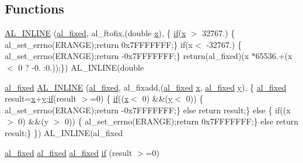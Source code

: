 \subsection*{Functions}
\begin{DoxyCompactItemize}
\item 
\hyperlink{fmaths_8inl_a212fd5cd1111c68a88623f17e1e4d2b9}{A\+L\+\_\+\+I\+N\+L\+I\+NE} (\hyperlink{fixed_8h_acaad2e927f969d9882d1e1e80ac1c5e2}{al\+\_\+fixed}, al\+\_\+ftofix,(double \hyperlink{fmaths_8inl_a7ba8ab2f1e8f362163e17da3f15a5db9}{x}), \{ \hyperlink{fmaths_8inl_a8ad2d7d1a24282db868a211942368bd1}{if}(\hyperlink{fmaths_8inl_a7ba8ab2f1e8f362163e17da3f15a5db9}{x} $>$ 32767.) \{ al\+\_\+set\+\_\+errno(E\+R\+A\+N\+GE);return 0x7\+F\+F\+F\+F\+F\+F\+F;\} if(x$<$ -\/32767.) \{ al\+\_\+set\+\_\+errno(\+E\+R\+A\+N\+G\+E);return -\/0x7\+F\+F\+F\+F\+F\+F\+F;\} return(al\+\_\+fixed)(x $\ast$65536.+(x$<$ 0 ? -\/0. \+:0.));\}) A\+L\+\_\+\+I\+N\+L\+I\+N\+E(double
\item 
\hyperlink{fixed_8h_acaad2e927f969d9882d1e1e80ac1c5e2}{al\+\_\+fixed} \hyperlink{fmaths_8inl_a60f6d5a1431c89de8d088dfb0381426f}{A\+L\+\_\+\+I\+N\+L\+I\+NE} (\hyperlink{fixed_8h_acaad2e927f969d9882d1e1e80ac1c5e2}{al\+\_\+fixed}, al\+\_\+fixadd,(\hyperlink{fixed_8h_acaad2e927f969d9882d1e1e80ac1c5e2}{al\+\_\+fixed} \hyperlink{fmaths_8inl_a7ba8ab2f1e8f362163e17da3f15a5db9}{x}, \hyperlink{fixed_8h_acaad2e927f969d9882d1e1e80ac1c5e2}{al\+\_\+fixed} \hyperlink{fmaths_8inl_ad01ab75ae50a1a624185bfa014c66cfa}{y}), \{ \hyperlink{fixed_8h_acaad2e927f969d9882d1e1e80ac1c5e2}{al\+\_\+fixed} result=\hyperlink{fmaths_8inl_a7ba8ab2f1e8f362163e17da3f15a5db9}{x}+\hyperlink{fmaths_8inl_ad01ab75ae50a1a624185bfa014c66cfa}{y};\hyperlink{fmaths_8inl_a8ad2d7d1a24282db868a211942368bd1}{if}(result $>$=0) \{ \hyperlink{fmaths_8inl_a8ad2d7d1a24282db868a211942368bd1}{if}((\hyperlink{fmaths_8inl_a7ba8ab2f1e8f362163e17da3f15a5db9}{x}$<$ 0) \&\&(\hyperlink{fmaths_8inl_ad01ab75ae50a1a624185bfa014c66cfa}{y}$<$ 0)) \{ al\+\_\+set\+\_\+errno(E\+R\+A\+N\+GE);return -\/0x7\+F\+F\+F\+F\+F\+F\+F;\} else return result;\} else \{ if((x $>$ 0) \&\&(y $>$ 0)) \{ al\+\_\+set\+\_\+errno(\+E\+R\+A\+N\+G\+E);return 0x7\+F\+F\+F\+F\+F\+F\+F;\} else return result;\} \}) A\+L\+\_\+\+I\+N\+L\+I\+N\+E(al\+\_\+fixed
\item 
\hyperlink{fixed_8h_acaad2e927f969d9882d1e1e80ac1c5e2}{al\+\_\+fixed} \hyperlink{fixed_8h_acaad2e927f969d9882d1e1e80ac1c5e2}{al\+\_\+fixed} \hyperlink{fixed_8h_acaad2e927f969d9882d1e1e80ac1c5e2}{al\+\_\+fixed} \hyperlink{fmaths_8inl_a8ad2d7d1a24282db868a211942368bd1}{if} (result $>$=0)

\end{DoxyCompactItemize}
